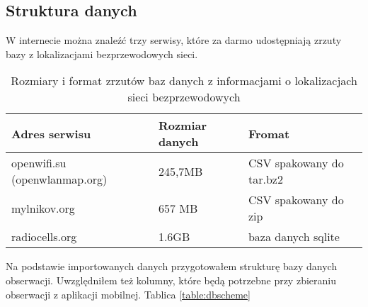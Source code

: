 \subsection{Struktura danych}
W internecie można znaleźć trzy serwisy, które za darmo udostępniają zrzuty bazy z lokalizacjami bezprzewodowych sieci.

\begin{table}
\caption{Rozmiary i format zrzutów baz danych z informacjami o lokalizacjach sieci bezprzewodowych}
\label{table:wifilocationdatabases}
\begin{tabular}{ |l|l|l|  }
\hline
Adres serwisu & Rozmiar danych & Fromat \\
\hline
\hline
openwifi.su (openwlanmap.org) & 245,7MB & CSV spakowany do tar.bz2 \\
\hline
mylnikov.org & 657 MB & CSV spakowany do zip \\
\hline
radiocells.org & 1.6GB & baza danych sqlite \\
\hline
\end{tabular}
\end{table}

Na podstawie importowanych danych przygotowałem strukturę bazy danych obserwacji. Uwzględniłem też kolumny, które będą potrzebne przy zbieraniu obserwacji z aplikacji mobilnej. Tablica \ref{table:dbscheme}

